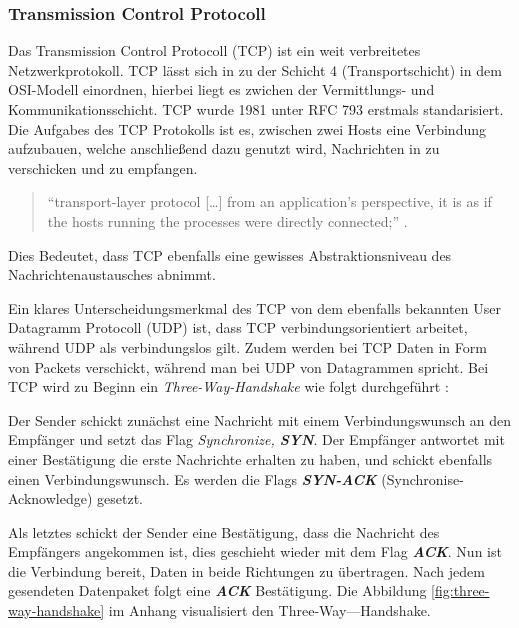 \documentclass[paper=a4,fontsize=12pt,ngerman]{scrartcl}
\begin{document}
\subsubsection{Transmission Control Protocoll}

Das Transmission Control Protocoll (TCP) ist ein weit verbreitetes Netzwerkprotokoll. 
TCP lässt sich in zu der Schicht 4 (Transportschicht) in dem OSI-Modell einordnen, hierbei liegt es zwichen der Vermittlungs- und Kommunikationsschicht.
\newline TCP wurde 1981 unter RFC 793 erstmals standarisiert. \cite{rfc793}  \newline
Die Aufgabes des TCP Protokolls ist es, zwischen zwei Hosts eine Verbindung aufzubauen, welche anschließend dazu genutzt wird,  
Nachrichten in zu verschicken und zu empfangen.

\begin{quote}
``transport-layer protocol [\dots] from an application’s perspective, it is as if 
the hosts running the processes were directly connected;'' \cite[241]{kr22}.      
\end{quote}


Dies Bedeutet, dass TCP ebenfalls eine gewisses Abstraktionsniveau
des Nachrichtenaustausches abnimmt. 


Ein klares Unterscheidungsmerkmal des TCP von dem ebenfalls bekannten User Datagramm Protocoll (UDP) ist, dass TCP verbindungsorientiert arbeitet, 
während UDP als verbindungslos gilt. Zudem werden bei TCP Daten in Form von Packets verschickt, während man bei UDP von Datagrammen spricht. \newline
Bei TCP wird zu Beginn ein \textit{Three-Way-Handshake}
wie folgt durchgeführt : 

Der Sender schickt zunächst eine Nachricht mit einem Verbindungswunsch an den Empfänger und setzt das Flag 
\textit{Synchronize, \textbf{SYN}}.
\newline
Der Empfänger antwortet mit einer Bestätigung die erste Nachrichte erhalten zu haben, und schickt ebenfalls einen 
Verbindungswunsch. Es werden die Flags \textit{\textbf{SYN-ACK}} (Synchronise-Acknowledge) gesetzt.


Als letztes schickt der Sender eine Bestätigung, dass die Nachricht des Empfängers angekommen ist, dies geschieht wieder
mit dem Flag \textit{\textbf{ACK}}. Nun ist die Verbindung bereit, Daten in beide Richtungen zu übertragen.
Nach jedem gesendeten Datenpaket folgt eine \textit{\textbf{ACK}} Bestätigung.
\newline Die Abbildung \ref{fig:three-way-handshake} im Anhang visualisiert den Three-Way—Handshake.
\end{document}
